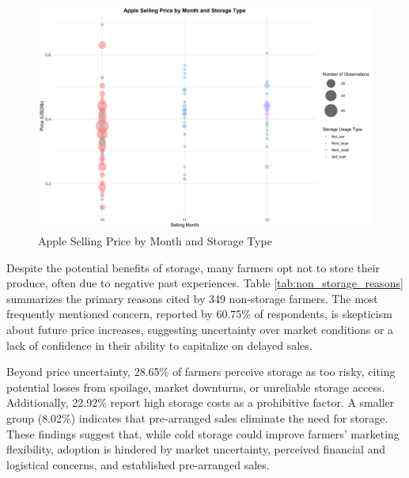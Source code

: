 \begin{figure}[H]
\centering
\includegraphics[width=1.05\textwidth]{figures/apple_price_bubble_plot.png}
\caption{Apple Selling Price by Month and Storage Type}
\label{Figure: selling price bubble}
\end{figure}

Despite the potential benefits of storage, many farmers opt not to store their produce, often due to negative past experiences. Table \ref{tab:non_storage_reasons} summarizes the primary reasons cited by 349 non-storage farmers. The most frequently mentioned concern, reported by 60.75\% of respondents, is skepticism about future price increases, suggesting uncertainty over market conditions or a lack of confidence in their ability to capitalize on delayed sales. 


Beyond price uncertainty, 28.65\% of farmers perceive storage as too risky, citing potential losses from spoilage, market downturns, or unreliable storage access. Additionally, 22.92\% report high storage costs as a prohibitive factor. A smaller group (8.02\%) indicates that pre-arranged sales eliminate the need for storage. These findings suggest that, while cold storage could improve farmers’ marketing flexibility, adoption is hindered by market uncertainty, perceived financial and logistical concerns, and established pre-arranged sales.  


